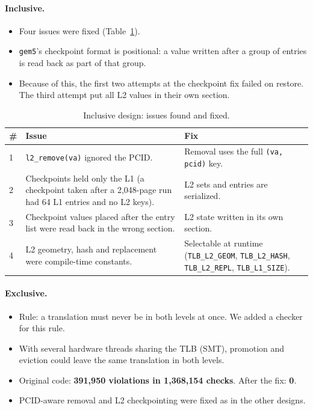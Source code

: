 \paragraph{Inclusive.}
\begin{itemize}
    \item Four issues were fixed (Table~\ref{tab:inc_bugs}).
    \item \texttt{gem5}'s checkpoint format is positional: a value written after a group of entries is read back as part of that group.
    \item Because of this, the first two attempts at the checkpoint fix failed on restore. The third attempt put all L2 values in their own section.
\end{itemize}

\begin{table}[H]
\centering
\small
\caption{Inclusive design: issues found and fixed.}
\label{tab:inc_bugs}
\begin{tabularx}{\textwidth}{l X X}
\toprule
\textbf{\#} & \textbf{Issue} & \textbf{Fix} \\
\midrule
1 & \texttt{l2\_remove(va)} ignored the PCID. & Removal uses the full \texttt{(va, pcid)} key. \\
2 & Checkpoints held only the L1 (a checkpoint taken after a 2,048-page run had 64 L1 entries and no L2 keys). & L2 sets and entries are serialized. \\
3 & Checkpoint values placed after the entry list were read back in the wrong section. & L2 state written in its own section. \\
4 & L2 geometry, hash and replacement were compile-time constants. & Selectable at runtime (\texttt{TLB\_L2\_GEOM}, \texttt{TLB\_L2\_HASH}, \texttt{TLB\_L2\_REPL}, \texttt{TLB\_L1\_SIZE}). \\
\bottomrule
\end{tabularx}
\end{table}

\paragraph{Exclusive.}
\begin{itemize}
    \item Rule: a translation must never be in both levels at once. We added a checker for this rule.
    \item With several hardware threads sharing the TLB (SMT), promotion and eviction could leave the same translation in both levels.
    \item Original code: \textbf{391,950 violations in 1,368,154 checks}. After the fix: \textbf{0}.
    \item PCID-aware removal and L2 checkpointing were fixed as in the other designs.
\end{itemize}


